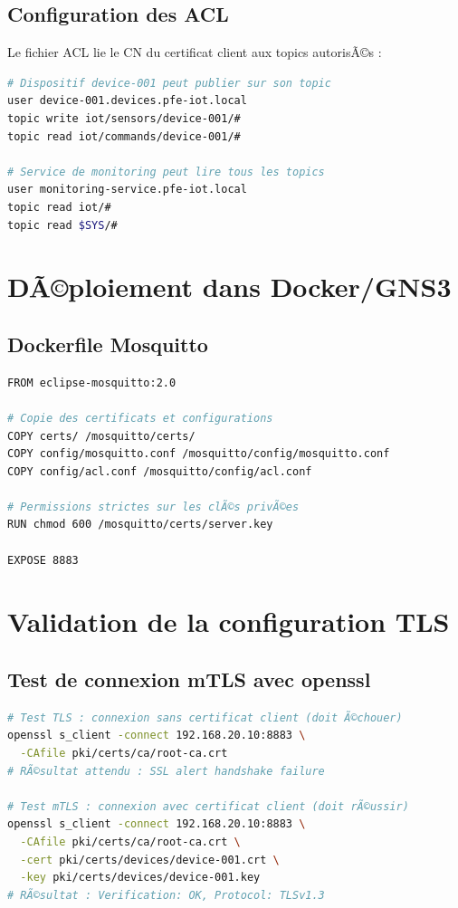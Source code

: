 \subsection{Configuration des ACL}

Le fichier ACL lie le CN du certificat client aux topics autorisÃ©s :

\begin{lstlisting}[language=bash, caption=Extrait du fichier ACL Mosquitto]
# Dispositif device-001 peut publier sur son topic
user device-001.devices.pfe-iot.local
topic write iot/sensors/device-001/#
topic read iot/commands/device-001/#

# Service de monitoring peut lire tous les topics
user monitoring-service.pfe-iot.local
topic read iot/#
topic read $SYS/#
\end{lstlisting}

\section{DÃ©ploiement dans Docker/GNS3}

\subsection{Dockerfile Mosquitto}

\begin{lstlisting}[language=bash, caption=Dockerfile du broker Mosquitto sÃ©curisÃ©]
FROM eclipse-mosquitto:2.0

# Copie des certificats et configurations
COPY certs/ /mosquitto/certs/
COPY config/mosquitto.conf /mosquitto/config/mosquitto.conf
COPY config/acl.conf /mosquitto/config/acl.conf

# Permissions strictes sur les clÃ©s privÃ©es
RUN chmod 600 /mosquitto/certs/server.key

EXPOSE 8883
\end{lstlisting}

\section{Validation de la configuration TLS}

\subsection{Test de connexion mTLS avec openssl}

\begin{lstlisting}[language=bash, caption=Test de la connexion mTLS]
# Test TLS : connexion sans certificat client (doit Ã©chouer)
openssl s_client -connect 192.168.20.10:8883 \
  -CAfile pki/certs/ca/root-ca.crt
# RÃ©sultat attendu : SSL alert handshake failure

# Test mTLS : connexion avec certificat client (doit rÃ©ussir)
openssl s_client -connect 192.168.20.10:8883 \
  -CAfile pki/certs/ca/root-ca.crt \
  -cert pki/certs/devices/device-001.crt \
  -key pki/certs/devices/device-001.key
# RÃ©sultat : Verification: OK, Protocol: TLSv1.3
\end{lstlisting}

